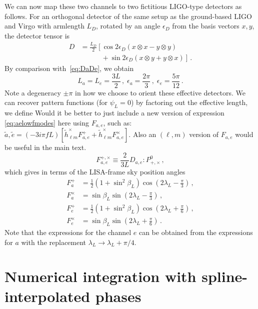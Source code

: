 \documentclass[aps,showpacs,twocolumn,prd,superscriptaddress,nofootinbib]{revtex4-1}
\newcommand{\be}{\begin{equation}}
\newcommand{\ee}{\end{equation}}
\newcommand{\bsub}{\begin{subequations}}
\newcommand{\esub}{\end{subequations}}
\newcommand{\nn}{\nonumber}
\newcommand\lambdaL{{\lambda_{L}}}
\newcommand{\jgb}[1]{{\color{DarkGreen} #1}}
\begin{document}
We can now map these two channels to two fictitious LIGO-type detectors as follows. For an orthogonal detector of the same setup as the ground-based LIGO and Virgo with armlength $L_{D}$, rotated by an angle $\epsilon_{D}$ from the basis vectors $x,y$, the detector tensor is
\begin{align}
	D &= \frac{L_{D}}{2} \left[ \cos 2\epsilon_{D} \left( x\otimes x - y\otimes y \right) \right. \nn\\
	& \qquad\quad + \left. \sin 2\epsilon_{D} \left( x\otimes y + y \otimes x\right) \right] \,.
\end{align}
By comparison with~\eqref{eq:DaDe}, we obtain
\be
	L_{a} = L_{e} = \frac{3L}{2} \,, \; \epsilon_{a} = \frac{2\pi}{3} \,, \; \epsilon_{e} = \frac{5\pi}{12} \,.
\ee
Note a degeneracy $\pm \pi$ in how we choose to orient these effective detectors.
We can recover pattern functions (for $\psi_{L}=0$) by factoring out the effective length, we define
\jgb{Would it be better to just include a new version of expression \eqref{eq:aelowfmodes} here using $F_{a,e}$, such as:
  $\tilde{a}, \tilde{e} = (-3i\pi f L)\left[ \tilde{h}_{\ell m}^\times F_{a,e}^+ + \tilde{h}_{\ell m}^\times F_{a,e}^\times\right]$. Also an $(\ell,m)$ version of $F_{a,e}$ would be useful in the main text.}
\be\label{eq:defFapcFepc}
	F_{a,e}^{+,\times} \equiv \frac{2}{3L} D_{a,e} : P_{+,\times}^{0} \,,
\ee
which gives in terms of the LISA-frame sky position angles
\bsub\label{eq:FapcFepc}
\begin{align}
	F_{a}^{+} &= \frac{1}{2} \left( 1 + \sin^{2}\beta_{L} \right) \cos \left(2\lambda_{L} - \frac{\pi}{3} \right) \,,\\
	F_{a}^{\times} &= \sin\beta_{L} \sin \left(2\lambda_{L} - \frac{\pi}{3} \right) \,,\\
	F_{e}^{+} &= \frac{1}{2} \left( 1 + \sin^{2}\beta_{L} \right) \cos \left(2\lambda_{L} + \frac{\pi}{6} \right) \,,\\
	F_{e}^{\times} &= \sin\beta_{L} \sin \left(2\lambda_{L} + \frac{\pi}{6} \right)  \,.
\end{align}
\esub
Note that the expressions for the channel $e$ can be obtained from the expressions for $a$ with the replacement $\lambdaL \rightarrow \lambdaL + \pi/4$.


\section{Numerical integration with spline-interpolated phases}
\label{app:numintegration}
\end{document}
